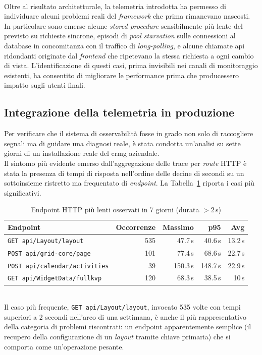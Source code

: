 \\
Oltre al risultato architetturale, la telemetria introdotta ha permesso di
individuare alcuni problemi reali del \emph{framework} che prima rimanevano
nascosti. In particolare sono emerse alcune \emph{stored procedure}
sensibilmente pi\`u lente del previsto su richieste sincrone, episodi di
\emph{pool starvation} sulle connessioni al database in concomitanza con il
traffico di \emph{long-polling}, e alcune chiamate \gls{api} ridondanti
originate dal \emph{frontend} che ripetevano la stessa richiesta a ogni
cambio di vista. L'identificazione di questi casi, prima invisibili nei canali
di monitoraggio esistenti, ha consentito di migliorare le performance
prima che producessero impatto sugli utenti finali.

\subsection{Integrazione della telemetria in produzione}

Per verificare che il sistema di osservabilità fosse in grado non solo di
raccogliere segnali ma di guidare una diagnosi reale, è stata condotta
un'analisi su sette giorni di un installazione reale del \gls{crmg} aziendale.\\
Il sintomo più evidente emerso dall'aggregazione delle trace per \emph{route} HTTP
è stata la presenza di tempi di risposta nell'ordine delle decine di secondi su un
sottoinsieme ristretto ma frequentato di \emph{endpoint}. La Tabella~\ref{tab:top-endpoint-lenti}
riporta i casi più significativi.
\begin{table}[h]
      \centering
      \caption{Endpoint HTTP più lenti osservati in 7 giorni (durata $>2$\,s)}
      \label{tab:top-endpoint-lenti}
      \begin{tabular}{|l|r|r|r|r|}
            \hline
            \textbf{Endpoint}                     & \textbf{Occorrenze} & \textbf{Massimo} & \textbf{p95} & \textbf{Avg} \\
            \hline
            \texttt{GET api/Layout/layout}        & 535                 & 47.7\,s          & 40.6\,s      & 13.2\,s      \\
            \hline
            \texttt{POST api/grid-core/page}      & 101                 & 77.4\,s          & 68.6\,s      & 22.7\,s      \\
            \hline
            \texttt{POST api/calendar/activities} & 39                  & 150.3\,s         & 148.7\,s     & 22.9\,s      \\
            \hline
            \texttt{GET api/WidgetData/fullkvp}   & 120                 & 68.3\,s          & 38.5\,s      & 10\,s        \\
            \hline
      \end{tabular}
\end{table}\\
Il caso più frequente, \texttt{GET api/Layout/layout}, invocato 535 volte con
tempi superiori a 2 secondi nell'arco di una settimana, è anche il più
rappresentativo della categoria di problemi riscontrati: un endpoint
apparentemente semplice (il recupero della configurazione di un \emph{layout}
tramite chiave primaria) che si comporta come un'operazione pesante.

